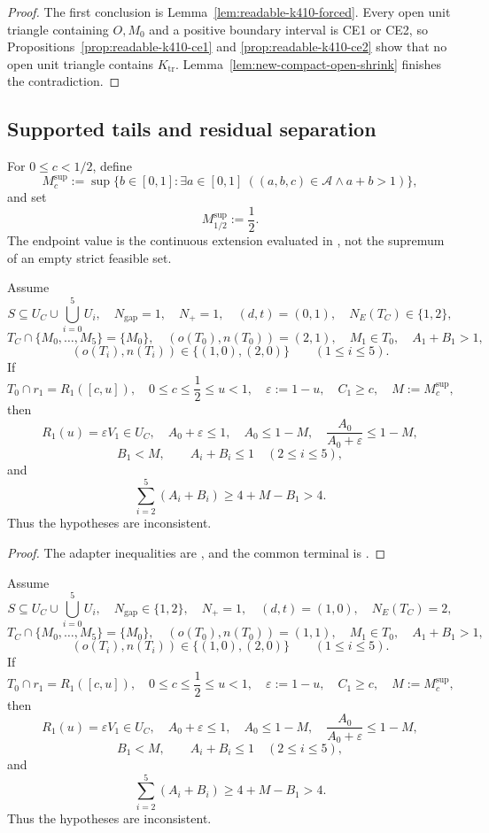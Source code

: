 \begin{proof}
The first conclusion is Lemma~\ref{lem:readable-k410-forced}.  Every open unit
triangle containing $O,M_0$ and a positive boundary interval is CE1 or CE2,
so Propositions~\ref{prop:readable-k410-ce1} and
\ref{prop:readable-k410-ce2} show that no open unit triangle contains
$K_{\mathrm{tr}}$.  Lemma~\ref{lem:new-compact-open-shrink} finishes the
contradiction.
\end{proof}

\subsection{Supported tails and residual separation}

For $0\le c<1/2$, define
\[
 M_c^{\mathrm{sup}}:=
 \sup\{b\in[0,1]:\exists a\in[0,1]\ ((a,b,c)\in\mathcal A\land a+b>1)\},
\]
and set
\[
 M_{1/2}^{\mathrm{sup}}:=\frac12.
\]
The endpoint value is the continuous extension evaluated in
, not the supremum of an empty strict
feasible set.

\begin{proposition}
\label{prop:new-one-t3-terminal}
Assume
\[
 S\subseteq U_C\cup\bigcup_{i=0}^5U_i,
 \quad N_{\mathrm{gap}}=1,
 \quad N_+=1,
 \quad(d,t)=(0,1),
 \quad N_E(T_C)\in\{1,2\},
\]
\[
 T_C\cap\{M_0,\ldots,M_5\}=\{M_0\},
 \quad (o(T_0),n(T_0))=(2,1),
 \quad M_1\in T_0,
 \quad A_1+B_1>1,
\]
\[
 (o(T_i),n(T_i))\in\{(1,0),(2,0)\}
 \qquad(1\le i\le5).
\]
If
\[
 T_0\cap r_1=R_1([c,u]),
 \quad 0\le c\le\frac12\le u<1,
 \quad \varepsilon:=1-u,
 \quad C_1\ge c,
 \quad M:=M_c^{\mathrm{sup}},
\]
then
\[
 R_1(u)=\varepsilon V_1\in U_C,
 \quad A_0+\varepsilon\le1,
 \quad A_0\le1-M,
 \quad \frac{A_0}{A_0+\varepsilon}\le1-M,
\]
\[
 B_1<M,
 \qquad A_i+B_i\le1\quad(2\le i\le5),
\]
and
\[
 \sum_{i=2}^5(A_i+B_i)\ge4+M-B_1>4.
\]
Thus the hypotheses are inconsistent.
\end{proposition}

\begin{proof}
The adapter inequalities are , and the
common terminal is .
\end{proof}

\begin{proposition}
\label{prop:finite-vd1-supported-terminal}
Assume
\[
 S\subseteq U_C\cup\bigcup_{i=0}^5U_i,
 \quad N_{\mathrm{gap}}\in\{1,2\},
 \quad N_+=1,
 \quad(d,t)=(1,0),
 \quad N_E(T_C)=2,
\]
\[
 T_C\cap\{M_0,\ldots,M_5\}=\{M_0\},
 \quad (o(T_0),n(T_0))=(1,1),
 \quad M_1\in T_0,
 \quad A_1+B_1>1,
\]
\[
 (o(T_i),n(T_i))\in\{(1,0),(2,0)\}
 \qquad(1\le i\le5).
\]
If
\[
 T_0\cap r_1=R_1([c,u]),
 \quad 0\le c\le\frac12\le u<1,
 \quad \varepsilon:=1-u,
 \quad C_1\ge c,
 \quad M:=M_c^{\mathrm{sup}},
\]
then
\[
 R_1(u)=\varepsilon V_1\in U_C,
 \quad A_0+\varepsilon\le1,
 \quad A_0\le1-M,
 \quad \frac{A_0}{A_0+\varepsilon}\le1-M,
\]
\[
 B_1<M,
 \qquad A_i+B_i\le1\quad(2\le i\le5),
\]
and
\[
 \sum_{i=2}^5(A_i+B_i)\ge4+M-B_1>4.
\]
Thus the hypotheses are inconsistent.
\end{proposition}

